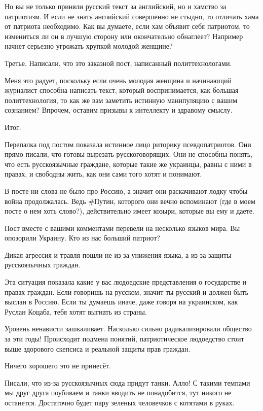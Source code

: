Но вы не только приняли русский текст за английский, но и хамство за
патриотизм. И если не знать английский совершенно не стыдно, то отличать хама
от патриота необходимо. Как вы думаете, если хам объявит себя патриотом, то
измениться ли он в лучшую сторону или окончательно обнаглеет? Например начнет
серьезно угрожать хрупкой молодой женщине?

Третье. Написали, что это заказной пост, написанный политтехнологами. 

Меня это радует, поскольку если очень молодая женщина и начинающий журналист
способна написать текст, который воспринимается, как большая политтехнология,
то как же вам заметить истинную манипуляцию с вашим сознанием? Впрочем, оставим
призывы к интеллекту и здравому смыслу.

Итог.

Перепалка под постом показала истинное лицо риторику псевдопатриотов. Они прямо
писали, что готовы вырезать русскоговорящих. Они не способны понять, что есть
русскоязычные граждане, которые такие же украинцы, равны с ними в правах, и
свободны жить, как они сами того хотят и понимают. 

В посте ни слова не было про Россию, а значит они раскачивают лодку чтобы война
продолжалась. Ведь #Путин, которого они вечно вспоминают (где в моем посте о
нем хоть слово?), действительно имеет козыри, которые вы ему и даете. 

Пост вместе с вашими комментами перевели на несколько языков мира. Вы опозорили Украину. Кто из нас больший патриот?

Дикая агрессия и травля пошли не из-за унижения языка, а из-за защиты русскоязычных граждан. 

Эта ситуация показала какие у вас людоедские представления о государстве и
правах граждан. Если говоришь на русском, значит ты русский и должен быть
выслан в Россию. Если ты думаешь иначе, даже говоря на украинском, как Руслан
Коцаба, тебя хотят выгнать из страны. 

Уровень ненависти зашкаливает. Насколько сильно радикализировали общество за
эти годы! Происходит подмена понятий, патриотическое людоедство стоит выше
здорового скепсиса и реальной защиты прав граждан. 

Ничего хорошего это не принесёт. 

Писали, что из-за русскоязычных сюда придут танки. Алло! С такими темпами мы
друг друга поубиваем и танки вводить не понадобится, тут никого не останется.
Достаточно будет пару зеленых человечков с котятами в руках. 

